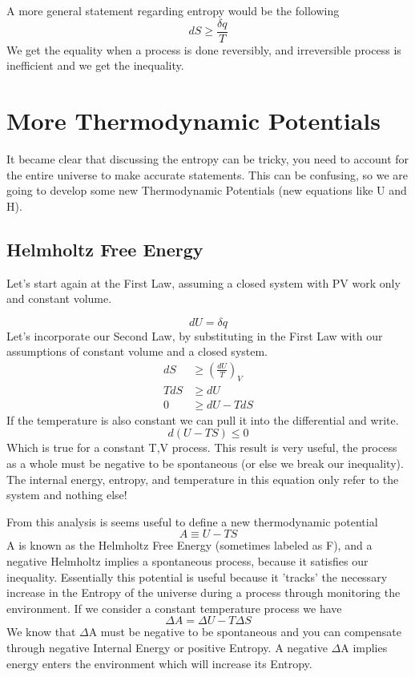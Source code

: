 \documentclass{article}
\newcommand{\be}{\begin{equation}}
\newcommand{\ee}{\end{equation}}
\begin{document}
A more general statement regarding entropy would be the following
\be
dS \geq \frac{\delta q}{T}
\ee
We get the equality when a process is done reversibly, and irreversible process is inefficient and we get the inequality. 

\section*{More Thermodynamic Potentials}
It became clear that discussing the entropy can be tricky, you need to account for the entire universe to make accurate statements.
This can be confusing, so we are going to develop some new Thermodynamic Potentials (new equations like U and H). 

\subsection*{Helmholtz Free Energy}
Let's start again at the First Law, assuming a closed system with PV work only and constant volume. 

\begin{equation}
    dU = \delta q
\end{equation}
Let's incorporate our Second Law, by substituting in the First Law with our assumptions of constant volume and a closed system.
\be
\begin{split}
    dS &\geq \left(\frac{dU}{T}\right)_V\\
    TdS &\geq dU \\
    0 &\geq dU - TdS
    \end{split}
\ee
If the temperature is also constant we can pull it into the differential and write. 
\begin{equation}
d(U-TS) \leq 0
\end{equation}
Which is true for a constant T,V process.
This result is very useful, the process as a whole must be negative to be spontaneous (or else we break our inequality). 
The internal energy, entropy, and temperature in this equation only refer to the system and nothing else!

From this analysis is seems useful to define a new thermodynamic potential 
\begin{equation}
A \equiv U - TS
\end{equation}
A is known as the Helmholtz Free Energy (sometimes labeled as F), and a negative Helmholtz implies a spontaneous process, because it satisfies our inequality. 
Essentially this potential is useful because it 'tracks' the  necessary increase in the Entropy of the universe during a process through monitoring the environment. 
If we consider a constant temperature process we have
\begin{equation}
\Delta A = \Delta U - T\Delta S
\end{equation}
We know that $\Delta$A must be negative to be spontaneous and you can compensate through negative Internal Energy or positive Entropy. 
A negative $\Delta$A implies energy enters the environment which will increase its Entropy. 
\end{document}
